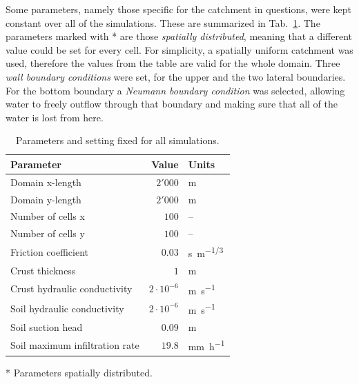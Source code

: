 Some parameters, namely those specific for the catchment in questions, were kept constant over all of the simulations.
These are summarized in Tab.~\ref{tab:simulations_parameters}.
The parameters marked with * are those \emph{spatially distributed}, meaning that a different value could be set for every cell.
For simplicity, a spatially uniform catchment was used, therefore the values from the table are valid for the whole domain.
Three \textit{wall boundary conditions} were set, for the upper and the two lateral boundaries.
For the bottom boundary a \textit{Neumann boundary condition} was selected, allowing water to freely outflow through that boundary and making sure that all of the water is lost from here.

\begin{table}[h]
  \centering
  \caption{Parameters and setting fixed for all simulations.}
  \label{tab:simulations_parameters}
  \begin{threeparttable}
    \begin{tabular}{lrl}
      \toprule
      \textbf{Parameter} & \textbf{Value} & \textbf{Units} \\
      \midrule
      Domain x-length                          &    $2'000$           & \si{\meter}   \\
      Domain y-length                          &    $2'000$           & \si{\meter}   \\
      Number of cells x                        &    $100$             & --   \\
      Number of cells y                        &    $100$             & --   \\
      Friction coefficient\tnote{*}            &    $0.03$            & \si{s.m^{-1/3}}\\
      Crust thickness\tnote{*}                 &    $1$               & \si{\meter}\\
      Crust hydraulic conductivity\tnote{*}    &    $2\cdot 10^{-6}$  & \si{\meter\per\second}\\
      Soil hydraulic conductivity\tnote{*}     &    $2\cdot 10^{-6}$  & \si{\meter\per\second}\\
      Soil suction head\tnote{*}               &    $0.09$      & \si{\meter}\\
      Soil maximum infiltration rate\tnote{*}  &    $19.8$      & \si{\milli\meter\per\hour}\\
      \bottomrule
    \end{tabular}
    \begin{tablenotes}
      \item[*] Parameters spatially distributed.
    \end{tablenotes}
  \end{threeparttable}
\end{table}


